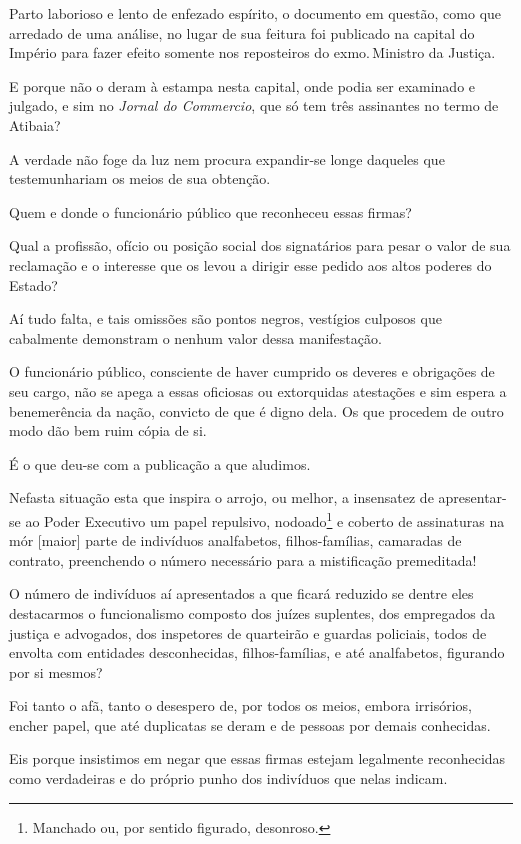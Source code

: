 Parto laborioso e lento de enfezado espírito, o documento em questão,
como que arredado de uma análise, no lugar de sua feitura foi publicado
na capital do Império para fazer efeito somente nos reposteiros do exmo.\,Ministro da Justiça.

E porque não o deram à estampa nesta capital, onde podia ser examinado e
julgado, e sim no \emph{Jornal do Commercio}, que só tem três assinantes
no termo de Atibaia?

A verdade não foge da luz nem procura expandir-se longe daqueles que
testemunhariam os meios de sua obtenção.

Quem e donde o funcionário público que reconheceu essas firmas?

Qual a profissão, ofício ou posição social dos signatários para pesar o
valor de sua reclamação e o interesse que os levou a dirigir esse pedido
aos altos poderes do Estado?

Aí tudo falta, e tais omissões são pontos negros, vestígios culposos que
cabalmente demonstram o nenhum valor dessa manifestação.

O funcionário público, consciente de haver cumprido os deveres e
obrigações de seu cargo, não se apega a essas oficiosas ou extorquidas
atestações e sim espera a benemerência da nação, convicto de que é digno
dela. Os que procedem de outro modo dão bem ruim cópia de si.

É o que deu-se com a publicação a que aludimos.

Nefasta situação esta que inspira o arrojo, ou melhor, a insensatez de
apresentar-se ao Poder Executivo um papel repulsivo, nodoado\footnote{
  Manchado ou, por sentido figurado, desonroso.} e coberto de
assinaturas na mór {[}maior{]} parte de indivíduos analfabetos,
filhos-famílias, camaradas de contrato, preenchendo o número necessário
para a mistificação premeditada!

O número de indivíduos aí apresentados a que ficará reduzido se dentre
eles destacarmos o funcionalismo composto dos juízes suplentes, dos
empregados da justiça e advogados, dos inspetores de quarteirão e
guardas policiais, todos de envolta com entidades desconhecidas,
filhos-famílias, e até analfabetos, figurando por si mesmos?

Foi tanto o afã, tanto o desespero de, por todos os meios, embora
irrisórios, encher papel, que até duplicatas se deram e de pessoas por
demais conhecidas.

Eis porque insistimos em negar que essas firmas estejam legalmente
reconhecidas como verdadeiras e do próprio punho dos indivíduos que
nelas indicam.

